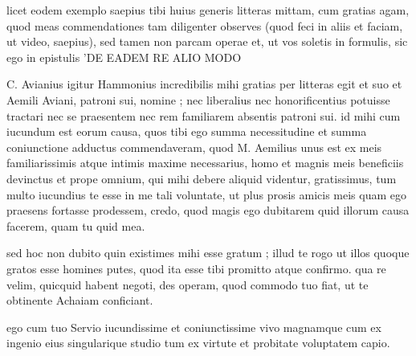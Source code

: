 


 licet eodem exemplo saepius tibi huius generis litteras mittam, cum gratias agam, quod meas commendationes tam diligenter observes (quod feci in aliis et faciam, ut video, saepius), sed tamen non parcam operae et, ut vos soletis in formulis, sic ego in epistulis 'DE EADEM RE ALIO MODO

 C. Avianius igitur Hammonius incredibilis mihi gratias per litteras egit et suo et Aemili Aviani, patroni sui, nomine ; nec liberalius nec honorificentius potuisse tractari nec se praesentem nec rem familiarem absentis patroni sui. id mihi cum iucundum est eorum causa, quos tibi ego summa necessitudine et summa coniunctione adductus commendaveram, quod M. Aemilius unus est ex meis familiarissimis atque intimis maxime necessarius, homo et magnis meis beneficiis devinctus et prope omnium, qui mihi debere aliquid videntur, gratissimus, tum multo iucundius te esse in me tali voluntate, ut plus prosis amicis meis quam ego praesens fortasse prodessem, credo, quod magis ego dubitarem quid illorum causa facerem, quam tu quid mea.

 sed hoc non dubito quin existimes mihi esse gratum ; illud te rogo ut illos quoque gratos esse homines putes, quod ita esse tibi promitto atque confirmo. qua re velim, quicquid habent negoti, des operam, quod commodo tuo fiat, ut te obtinente Achaiam conficiant.

 ego cum tuo Servio iucundissime et coniunctissime vivo magnamque cum ex ingenio eius singularique studio tum ex virtute et probitate voluptatem capio.

